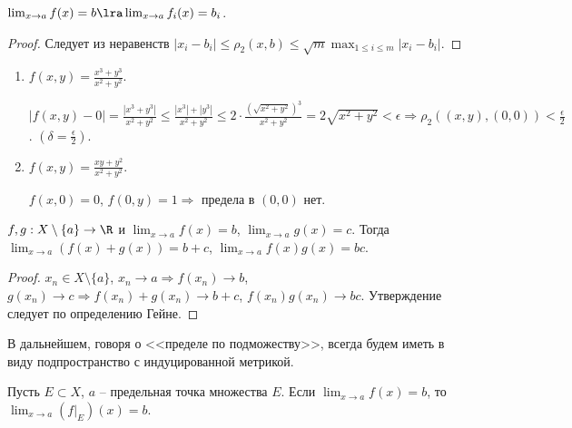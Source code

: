 \begin{lemma}
    $\lim_{x \to a}f(x) = b \lra \lim_{x \to a} f_{i}(x) = b_{i}$.
\end{lemma}

\begin{proof}
    Следует из неравенств $|x_{i} - b_{i}| \leq \rho_{2}(x, b) \leq \sqrt{m}\max_{1 \leq i \leq m}|x_{i} - b_{i}|$.
\end{proof}

\begin{example}
    \begin{enumerate}
        \item $f(x, y) = \frac{x^{3} + y^{3}}{x^{2} + y^{2}}$.

        $|f(x, y) - 0| = \frac{|x^{3} + y^{3}|}{x^{2} + y^{2}} \leq \frac{|x^3| + |y^3|}{x^2 + y^2} \leq 2\cdot \frac{\left(\sqrt{x^2 + y^2}\right)^{3}}{x^2 + y^2} = 2\sqrt{x^2 + y^2} < \epsilon \Rightarrow \rho_{2}((x, y), (0, 0)) < \frac{\epsilon}{2}$. $(\delta = \frac{\epsilon}{2})$.

        \item $f(x, y) = \frac{xy + y^2}{x^2 + y^2}$.

        $f(x, 0) = 0$, $f(0, y) = 1 \Rightarrow$ предела в $(0, 0)$ нет.
    \end{enumerate}
\end{example}

\begin{property}
    $f, g: X \setminus \{a\} \to \R$ и $\lim_{x \to a} f(x) = b$, $\lim_{x \to a} g(x) = c$. Тогда $\lim_{x \to a} (f(x) + g(x)) = b + c$, $\lim_{x \to a} f(x)g(x) = bc$.
\end{property}

\begin{proof}
    $x_{n} \in X \setminus \{a\}$, $x_{n} \to a \Rightarrow f(x_{n}) \to b$, $g(x_{n}) \to c \Rightarrow f(x_{n}) + g(x_{n}) \to b + c$, $f(x_{n})g(x_{n}) \to bc$. Утверждение следует по определению Гейне.
\end{proof}

В дальнейшем, говоря о <<пределе по подможеству>>, всегда будем иметь в виду подпространство с индуцированной метрикой.

\begin{property}
    \label{proper3}
    Пусть $E \subset X$, $a$ -- предельная точка множества $E$. Если $\lim_{x \to a} f(x) = b$, то $\lim_{x \to a} (f|_{E})(x) = b$.
\end{property}

